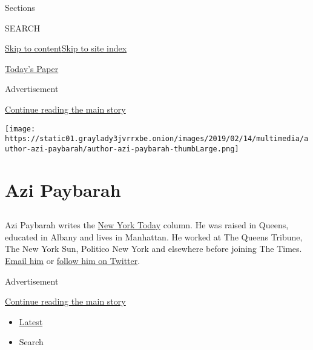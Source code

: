 Sections

SEARCH

\protect\hyperlink{site-content}{Skip to
content}\protect\hyperlink{site-index}{Skip to site index}

\href{https://myaccount.nytimes3xbfgragh.onion/auth/login?response_type=cookie\&client_id=vi}{}

\href{https://www.nytimes3xbfgragh.onion/section/todayspaper}{Today's
Paper}

Advertisement

\protect\hyperlink{after-top}{Continue reading the main story}

\texttt{[image: https://static01.graylady3jvrrxbe.onion/images/2019/02/14/multimedia/author-azi-paybarah/author-azi-paybarah-thumbLarge.png]}

\hypertarget{azi-paybarah}{%
\section{Azi Paybarah}\label{azi-paybarah}}

\subsection{}

Azi Paybarah writes the
\href{https://www.nytimes3xbfgragh.onion/column/ny-today-daily-briefings}{New
York Today} column. He was raised in Queens, educated in Albany and
lives in Manhattan. He worked at The Queens Tribune, The New York Sun,
Politico New York and elsewhere before joining The Times.
\href{mailto:azi.paybarah@NYTimes.com}{Email him} or
\href{https://twitter.com/Azi}{follow him on Twitter}.

Advertisement

\protect\hyperlink{after-mid1}{Continue reading the main story}

\begin{itemize}
\tightlist
\item
  \protect\hyperlink{stream-panel}{Latest}
\item
  Search
\end{itemize}

